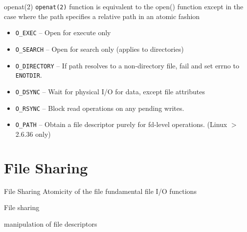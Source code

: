 \documentclass[newPxFont,sthlmFooter,nooffset]{beamer}
\begin{document}
\begin{frame}[t]{openat(2)}
\texttt{openat(2)} function is equivalent to the open() function except in the case where the path specifies a relative path in an atomic fashion
\bigskip


\begin{itemize}
	\item \texttt{O\_EXEC} -- Open for execute only
	\item \texttt{O\_SEARCH} -- Open for search only (applies to directories)
	\item \texttt{O\_DIRECTORY} -- If path resolves to a non-directory file, fail and set errno to \texttt{ENOTDIR}.
	\item \texttt{O\_DSYNC} -- Wait for physical I/O for data, except
file attributes
	\item \texttt{O\_RSYNC} -- Block read operations on any pending writes.
	\item \texttt{O\_PATH} -- Obtain a file descriptor purely for fd-level operations. (Linux $>$2.6.36 only)
\end{itemize}

\end{frame}









\section{File Sharing} 

\begin{frame}[t]{File Sharing}
Atomicity of the file fundamental file I/O functions
\bigskip

File sharing
\bigskip

manipulation of file descriptors
\end{frame}
\end{document}
